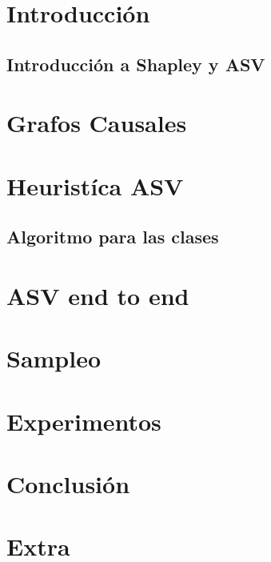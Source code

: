 \documentclass{beamer}
\begin{document}
\section{Introducción}



\subsection{Introducción a Shapley y ASV}



\section{Grafos Causales}



\section{Heuristíca ASV}




\subsection{Algoritmo para las clases}



\section{ASV end to end}



\section{Sampleo} %



\section{Experimentos}



\section{Conclusión}



\section{Extra}




%
\end{document}
